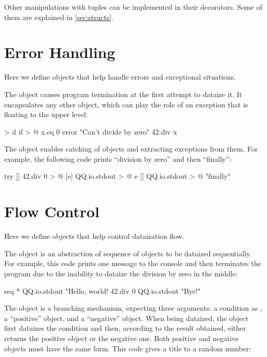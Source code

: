 \documentclass[sigplan,nonacm]{acmart}
\newcommand\aff[1]{\ff{\textcolor{gray}{\(\star\)}#1}}
\newcommand\adeff[1]{\aff{\textcolor{blue!50!black}{\textbf{#1}}}}
\begin{document}
Other manipulations with tuples can be implemented in their
decorators. Some of them are explained in \cref{sec:structs}.

\section{Error Handling}\label{sec:errors}

Here we define objects that help handle errors and exceptional situations.

The \adeff{error} object causes program termination at the first attempt to dataize it.
It encapsulates any other object, which can play the role of an exception that is floating to the upper level:

\begin{ffcode}
[x] > d
  if > @
    x.eq 0
    error "Can't divide by zero"
    42.div x
\end{ffcode}

The \adeff{try} object enables catching of \aff{error} objects and extracting exceptions from them.
For example, the following code prints ``division by zero'' and then ``finally'':

\begin{ffcode}
try
  []
    42.div 0 > @
  [e]
    QQ.io.stdout > @
      e
  []
    QQ.io.stdout > @
      "finally"
\end{ffcode}

\section{Flow Control}\label{sec:flow}

Here we define objects that help control dataization flow.

The \adeff{seq} object is an abstraction of sequence of objects to be dataized sequentially.
For example, this code prints one message to the console and then terminates the program due to the inability to dataize the division by zero in the middle:

\begin{ffcode}
seq *
  QQ.io.stdout "Hello, world!
  42.div 0
  QQ.io.stdout "Bye!"
\end{ffcode}

The \adeff{if} object is a branching mechanism, expecting three arguments: a
condition as , a ``positive'' object, and a ``negative'' object. When
being dataized, the object \aff{if} first dataizes the condition and then,
according to the result obtained, either returns the positive object or the
negative one. Both positive and negative objects must have the same form. This
code gives a title to a random number:
\end{document}
